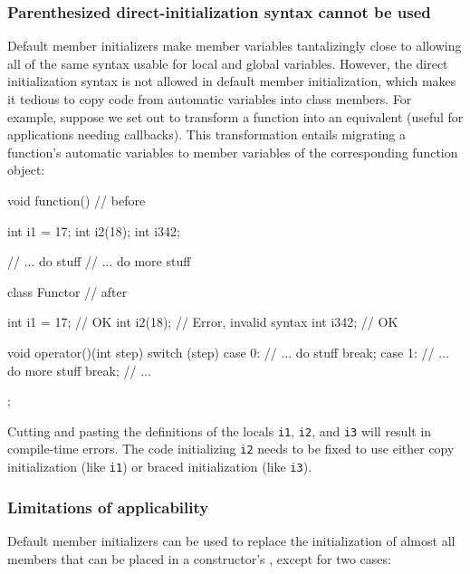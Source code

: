 \subsubsection[Parenthesized direct-initialization syntax cannot be used]{Parenthesized direct-initialization syntax cannot be used}\label{parenthesized-direct-initialization-syntax-cannot-be-used}

Default member initializers make member variables tantalizingly close to
allowing all of the same syntax usable for local and global variables.
However, the direct initialization syntax is not allowed in default
member initialization, which makes it tedious to copy code from
automatic variables into class members. For example, suppose we set out
to transform a function into an equivalent 
(useful for applications needing callbacks). This transformation entails
migrating a function's automatic variables to member variables of the
corresponding function object:

\begin{emcppslisting}
void function()  // before
{
    int i1 = 17;
    int i2(18);
    int i3{42};

    // ... do stuff
    // ... do more stuff
}

class Functor  // after
{
    int i1 = 17;  // OK
    int i2(18);   // Error, invalid syntax
    int i3{42};   // OK

    void operator()(int step)
    {
       switch (step)
       {
       case 0:  // ... do stuff
           break;
       case 1:  // ... do more stuff
           break;
           // ...
       }
    }
};
\end{emcppslisting}
    

Cutting and pasting the definitions of the locals \lstinline!i1!,
\lstinline!i2!, and \lstinline!i3! will result in compile-time errors. The
code initializing \lstinline!i2! needs to be fixed to use either copy
initialization (like \lstinline!i1!) or braced initialization (like
\lstinline!i3!).

\subsubsection[Limitations of applicability]{Limitations of applicability}\label{limitations-of-applicability}

Default member initializers can be used to replace the initialization of
almost all members that can be placed in a constructor's , except for two cases:

